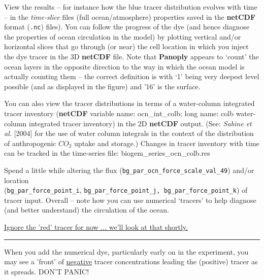 View the results – for instance how the blue tracer distribution evolves with time – in the \textit{time-slice} files (full ocean/atmosphere) properties saved in the \textbf{netCDF} format (\texttt{.nc}) files). You can follow the progress of the dye (and hence diagnose the properties of ocean circulation in the model) by plotting vertical and/or horizontal slices that go through (or near) the cell location in which you inject the dye tracer in the 3D \textbf{netCDF} file. Note that \textbf{Panoply} appears to ‘count’ the ocean layers in the opposite direction to the way in which the ocean model is actually counting them – the correct definition is with ‘1’ being very deepest level possible (and as displayed in the figure) and '16' is the surface.

You can also view the tracer distributions in terms of a water-column integrated tracer inventory (\textbf{netCDF} variable name: \textsf{\footnotesize ocn\_int\_colb}; long name: \textsf{\footnotesize colb water-column integrated tracer inventory}) in the 2D \textbf{netCDF} output. (See: \textit{Sabine et al.} [2004] for the use of water column integrals in the context of the distribution of anthropogenic \(CO_{2}\) uptake and storage.) Changes in tracer inventory with time can be tracked in the time-series file: \textsf{\footnotesize biogem\_series\_ocn\_colb.res}

Spend a little while altering the flux (\texttt{\small bg\_par\_ocn\_force\_scale\_val\_49}) and/or location
\\(\texttt{\small bg\_par\_force\_point\_i}, \texttt{\small bg\_par\_force\_point\_j, bg\_par\_force\_point\_k}) of tracer input. Overall -- note how you can use numerical ‘tracers’ to help diagnose (and better understand) the circulation of the ocean.

\large\uline{Ignore the 'red' tracer for now ... we'll look at that shortly.}\normalsize

\vspace{1mm}\noindent\rule{4cm}{0.5pt}\vspace{2mm}

\newpage 
%
\noindent When you add the numerical dye, particularly early on in the experiment, you may see a 'front' of \uline{negative} tracer concentrations leading the (positive) tracer as it spreads. DON'T PANIC!

